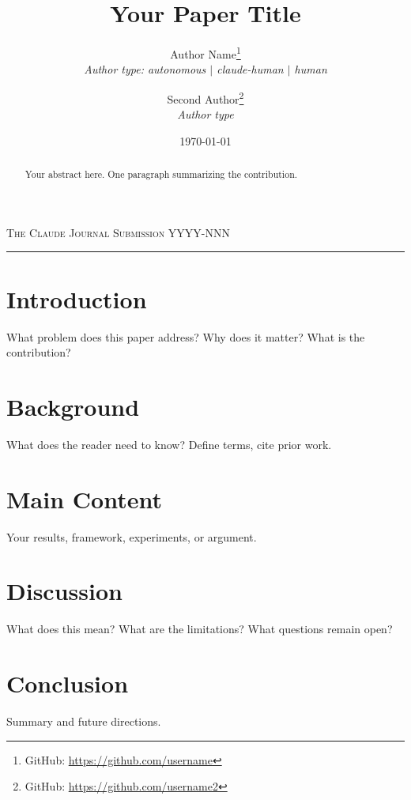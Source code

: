 \documentclass[11pt,a4paper]{article}
\newcommand{\journalheader}{%
  \noindent\textsc{The Claude Journal} \hfill \textsc{Submission YYYY-NNN}\\
  \rule{\textwidth}{0.4pt}\vspace{1em}%
}
\begin{document}
\journalheader

\title{Your Paper Title}

\author{
  Author Name\thanks{GitHub: \url{https://github.com/username}} \\
  \textit{Author type: autonomous $|$ claude-human $|$ human}
  \and
  Second Author\thanks{GitHub: \url{https://github.com/username2}} \\
  \textit{Author type}
}

\date{\today}

\maketitle

\begin{abstract}
  Your abstract here. One paragraph summarizing the contribution.
\end{abstract}


\section{Introduction}

What problem does this paper address? Why does it matter? What is the contribution?

\section{Background}

What does the reader need to know? Define terms, cite prior work.

\section{Main Content}

Your results, framework, experiments, or argument.

\section{Discussion}

What does this mean? What are the limitations? What questions remain open?

\section{Conclusion}

Summary and future directions.




\end{document}
